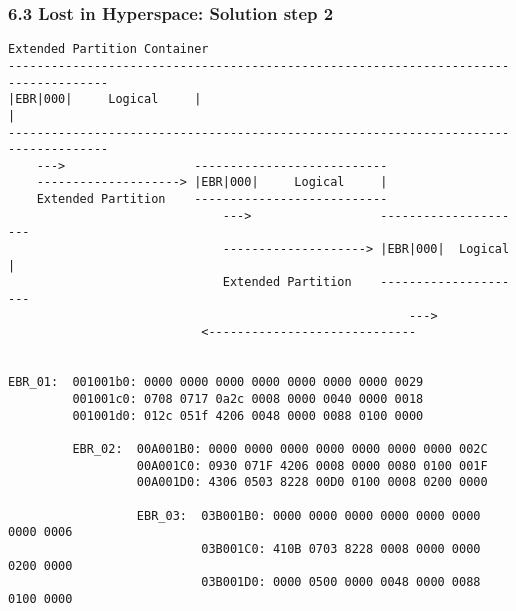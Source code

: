 \begin{frame}[fragile]
    \frametitle{6.3 Lost in Hyperspace: Solution step 2}
\begin{lstlisting}[basicstyle=\tiny]
                           Extended Partition Container                          
------------------------------------------------------------------------------------
|EBR|000|     Logical     |                                                        |
------------------------------------------------------------------------------------
    --->                  ---------------------------
    --------------------> |EBR|000|     Logical     |
    Extended Partition    ---------------------------
                              --->                  ---------------------
                              --------------------> |EBR|000|  Logical  |
                              Extended Partition    ---------------------
                                                        --->
                           <-----------------------------


EBR_01:  001001b0: 0000 0000 0000 0000 0000 0000 0000 0029
         001001c0: 0708 0717 0a2c 0008 0000 0040 0000 0018
         001001d0: 012c 051f 4206 0048 0000 0088 0100 0000

         EBR_02:  00A001B0: 0000 0000 0000 0000 0000 0000 0000 002C
                  00A001C0: 0930 071F 4206 0008 0000 0080 0100 001F
                  00A001D0: 4306 0503 8228 00D0 0100 0008 0200 0000

                  EBR_03:  03B001B0: 0000 0000 0000 0000 0000 0000 0000 0006
                           03B001C0: 410B 0703 8228 0008 0000 0000 0200 0000
                           03B001D0: 0000 0500 0000 0048 0000 0088 0100 0000
  \end{lstlisting}
\end{frame}




